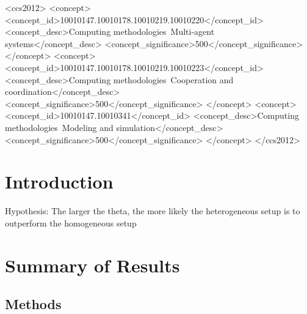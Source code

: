 \documentclass[sigconf]{aamas}  %
\begin{document}
\begin{CCSXML}
<ccs2012>
<concept>
<concept_id>10010147.10010178.10010219.10010220</concept_id>
<concept_desc>Computing methodologies~Multi-agent systems</concept_desc>
<concept_significance>500</concept_significance>
</concept>
<concept>
<concept_id>10010147.10010178.10010219.10010223</concept_id>
<concept_desc>Computing methodologies~Cooperation and coordination</concept_desc>
<concept_significance>500</concept_significance>
</concept>
<concept>
<concept_id>10010147.10010341</concept_id>
<concept_desc>Computing methodologies~Modeling and simulation</concept_desc>
<concept_significance>500</concept_significance>
</concept>
</ccs2012>
\end{CCSXML}




\maketitle



\section{Introduction}

Hypothesis: The larger the theta, the more likely the heterogeneous setup is to outperform the homogeneous setup

\section{Summary of Results \label{results}}

\subsection{Methods}
\end{document}

